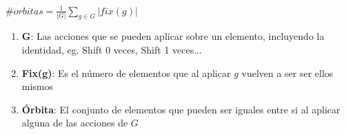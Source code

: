$\#orbitas = \frac{1}{|G|}\sum_{g \in G}|fix(g)|$

\begin{enumerate}
    \item \textbf{G}: Las acciones que se pueden aplicar sobre un elemento, incluyendo la identidad, eg. Shift 0 veces, Shift 1 veces...
    \item \textbf{Fix(g)}: Es el número de elementos que al aplicar $g$ vuelven a ser ser ellos mismos
    \item \textbf{Órbita}: El conjunto de elementos que pueden ser iguales entre si al aplicar alguna de las acciones de $G$
\end{enumerate}